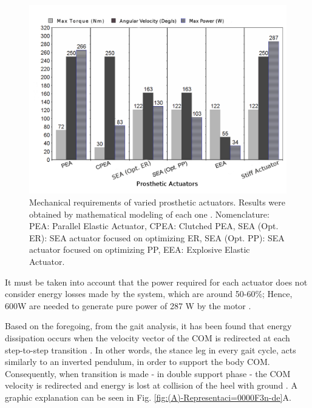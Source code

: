 \documentclass[12pt,english]{article}
\begin{document}
\begin{figure}[H]
\begin{centering}
\includegraphics[scale=0.55]{20160414035751}
\par\end{centering}

\caption{\label{fig:Variables-mec=0000E1nicas-actuadores}Mechanical requirements of varied prosthetic actuators. Results were obtained by mathematical modeling of each one \cite{Cherelle2014a}. Nomenclature: PEA: Parallel Elastic Actuator, CPEA: Clutched PEA, SEA (Opt. ER): SEA actuator focused on optimizing ER,
SEA (Opt. PP): SEA actuator focused on optimizing PP, EEA: Explosive Elastic Actuator. }
\end{figure}

It must be taken into account that the power required for each actuator does not consider energy losses made by the system, which are around 50-60\%; Hence, 600W are needed to generate pure power of 287 W by the motor \cite{Cherelle2014a}.


Based on the foregoing, from the gait analysis, it has been found that energy dissipation occurs when the velocity vector of the COM is redirected at each step-to-step transition \cite{Donelan2002}. In other words, the stance leg in every gait cycle, acts similarly to an inverted pendulum, in order to support the body COM. Consequently, when transition is made - in double support phase - the COM velocity is redirected and energy is lost at collision of the heel with ground \cite{Collins2010}. A graphic explanation can be seen in Fig. \ref{fig:(A)-Representaci=0000F3n-de}A.
\end{document}
